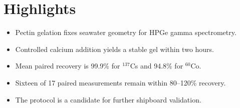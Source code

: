 \documentclass[12pt]{article}
\begin{document}
\section*{Highlights}

\begin{itemize}
    \item Pectin gelation fixes seawater geometry for HPGe gamma spectrometry.
    \item Controlled calcium addition yields a stable gel within two hours.
    \item Mean paired recovery is 99.9\% for $^{137}$Cs and 94.8\% for $^{60}$Co.
    \item Sixteen of 17 paired measurements remain within 80--120\% recovery.
    \item The protocol is a candidate for further shipboard validation.
\end{itemize}
\end{document}
